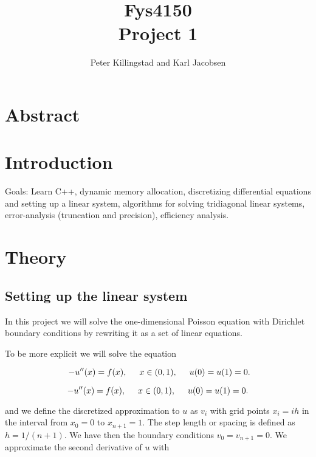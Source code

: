 \documentclass{article}
\title{Fys4150\\Project 1\\ }
\author{Peter Killingstad and Karl Jacobsen}
\begin{document}
	
\maketitle

\tableofcontents

\pagebreak
\section{Abstract}

\section{Introduction}
Goals: Learn C++, dynamic memory allocation, discretizing differential equations and setting up a linear system, algorithms for solving tridiagonal linear systems, error-analysis (truncation and precision), efficiency analysis.

\section{Theory}


\subsection{Setting up the linear system}
In this project we will solve the one-dimensional Poisson equation
with Dirichlet boundary conditions by rewriting it as a set of linear equations.


To be more explicit we will solve the equation

\begin{equation}\
-u''(x) = f(x), \hspace{0.5cm} x\in(0,1), \hspace{0.5cm} u(0) = u(1) = 0.
\end{equation}

\begin{equation}
-u''(x) = f(x), \hspace{0.5cm} x\in(0,1), \hspace{0.5cm} u(0) = u(1) = 0.
\label{eqn:diffEquation}
\end{equation}

and we define the discretized approximation  to $u$ as $v_i$  with 
grid points $x_i=ih$   in the interval from $x_0=0$ to $x_{n+1}=1$.
The step length or spacing is defined as $h=1/(n+1)$. 
We have then the boundary conditions $v_0 = v_{n+1} = 0$.
We  approximate the second
derivative of $u$ with
\end{document}
